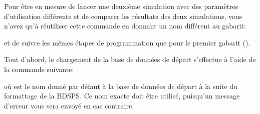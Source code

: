 \documentclass[letterpaper,10pt,french]{sphinxmanual}
\begin{document}
Pour être en mesure de lancer une deuxième simulation avec des paramètres d’utilisation différents et de comparer les résultats des deux simulations,
vous n’avez qu’à réutiliser cette commande en donnant un nom différent au gabarit:

\begin{sphinxVerbatim}[commandchars=\\\{\}]
  
\end{sphinxVerbatim}

et de suivre les mêmes étapes de programmation que pour le premier gabarit ().


Tout d’abord, le chargement de la base de données de départ s’effectue à l’aide de la commande suivante:

\begin{sphinxVerbatim}[commandchars=\\\{\}]
\end{sphinxVerbatim}

où  est le nom donné par défaut à la base de données de départ à la suite du formattage de la BDSPS.
Ce nom exacte doit être utilisé, puisqu’un message d’erreur vous sera envoyé en cas contraire.

\end{document}
